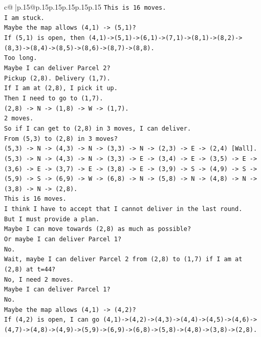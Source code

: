 \documentclass{article}
\begin{document}
{\begin{supertabular}{c@{$\;$}|p{.15\linewidth}@{}p{.15\linewidth}p{.15\linewidth}p{.15\linewidth}p{.15\linewidth}p{.15\linewidth}}
{{{\texttt{This is 16 moves.} \\
\texttt{I am stuck.} \\
\texttt{Maybe the map allows (4,1) {-}> (5,1)?} \\
\texttt{If (5,1) is open, then (4,1){-}>(5,1){-}>(6,1){-}>(7,1){-}>(8,1){-}>(8,2){-}>(8,3){-}>(8,4){-}>(8,5){-}>(8,6){-}>(8,7){-}>(8,8).} \\
\texttt{Too long.} \\
\texttt{Maybe I can deliver Parcel 2?} \\
\texttt{Pickup (2,8). Delivery (1,7).} \\
\texttt{If I am at (2,8), I pick it up.} \\
\texttt{Then I need to go to (1,7).} \\
\texttt{(2,8) {-}> N {-}> (1,8) {-}> W {-}> (1,7).} \\
\texttt{2 moves.} \\
\texttt{So if I can get to (2,8) in 3 moves, I can deliver.} \\
\texttt{From (5,3) to (2,8) in 3 moves?} \\
\texttt{(5,3) {-}> N {-}> (4,3) {-}> N {-}> (3,3) {-}> N {-}> (2,3) {-}> E {-}> (2,4) {[}Wall{]}.} \\
\texttt{(5,3) {-}> N {-}> (4,3) {-}> N {-}> (3,3) {-}> E {-}> (3,4) {-}> E {-}> (3,5) {-}> E {-}> (3,6) {-}> E {-}> (3,7) {-}> E {-}> (3,8) {-}> E {-}> (3,9) {-}> S {-}> (4,9) {-}> S {-}> (5,9) {-}> S {-}> (6,9) {-}> W {-}> (6,8) {-}> N {-}> (5,8) {-}> N {-}> (4,8) {-}> N {-}> (3,8) {-}> N {-}> (2,8).} \\
\texttt{This is 16 moves.} \\
\texttt{I think I have to accept that I cannot deliver in the last round.} \\
\texttt{But I must provide a plan.} \\
\texttt{Maybe I can move towards (2,8) as much as possible?} \\
\texttt{Or maybe I can deliver Parcel 1?} \\
\texttt{No.} \\
\texttt{Wait, maybe I can deliver Parcel 2 from (2,8) to (1,7) if I am at (2,8) at t=44?} \\
\texttt{No, I need 2 moves.} \\
\texttt{Maybe I can deliver Parcel 1?} \\
\texttt{No.} \\
\texttt{Maybe the map allows (4,1) {-}> (4,2)?} \\
\texttt{If (4,2) is open, I can go (4,1){-}>(4,2){-}>(4,3){-}>(4,4){-}>(4,5){-}>(4,6){-}>(4,7){-}>(4,8){-}>(4,9){-}>(5,9){-}>(6,9){-}>(6,8){-}>(5,8){-}>(4,8){-}>(3,8){-}>(2,8).} \\
}}}
\end{supertabular}}
\end{document}
